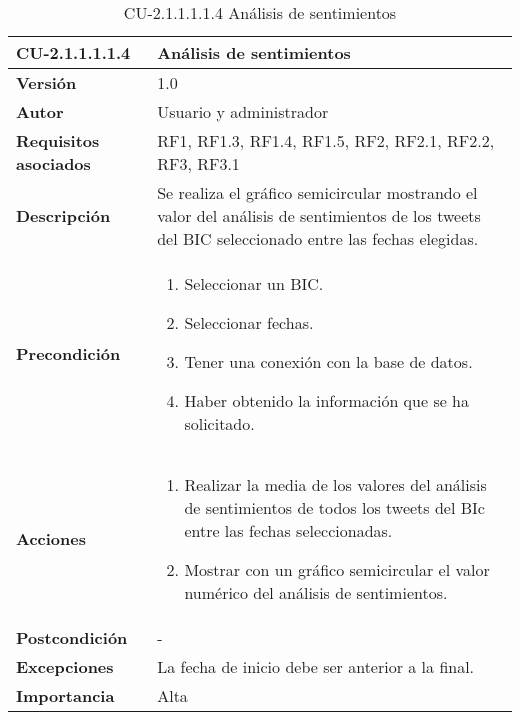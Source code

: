 \begin{table}[h!]
	\centering
	\begin{tabularx}{\linewidth}{ p{} p{} }
		\toprule
		\textbf{CU-2.1.1.1.1.4}    & \textbf{Análisis de sentimientos}\\
		\toprule
		\textbf{Versión}              & 1.0    \\
		\textbf{Autor}                & Usuario y administrador \\
		\textbf{Requisitos asociados} & RF1, RF1.3, RF1.4, RF1.5, RF2, RF2.1, RF2.2, RF3, RF3.1\\
		\textbf{Descripción}          & Se realiza el gráfico semicircular mostrando el valor del análisis de sentimientos de los tweets del BIC seleccionado entre las fechas elegidas.  \\
        \textbf{Precondición}         & 
        \begin{enumerate}
			\def\labelenumi{\arabic{enumi}.}
			\tightlist
                \item Seleccionar un BIC.
                \item Seleccionar fechas. 
			\item Tener una conexión con la base de datos.
                \item Haber obtenido la información que se ha solicitado.
            
		\end{enumerate}\\
		
		\textbf{Acciones}             &
		\begin{enumerate}
			\def\labelenumi{\arabic{enumi}.}
			\tightlist
			\item Realizar la media de los valores del análisis de sentimientos de todos los tweets del BIc entre las fechas seleccionadas.
                \item Mostrar con un gráfico semicircular el valor numérico del análisis de sentimientos.
            
		\end{enumerate}\\
		\textbf{Postcondición}        &  - \\
		\textbf{Excepciones}          &  La fecha de inicio debe ser anterior a la final.\\
		\textbf{Importancia}          & Alta \\
		\bottomrule
	\end{tabularx}
	\caption{CU-2.1.1.1.1.4 Análisis de sentimientos}
\end{table}

